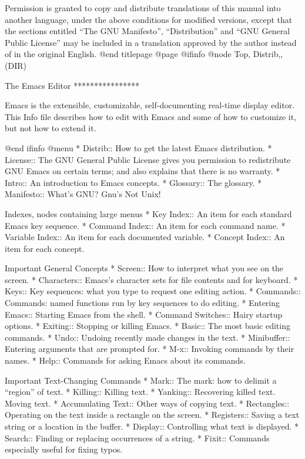 Permission is granted to copy and distribute translations of this manual
into another language, under the above conditions for modified versions,
except that the sections entitled ``The GNU Manifesto'',
``Distribution'' and ``GNU General Public License'' may be included in a
translation approved by the author instead of in the original English.
@end titlepage
@page
@ifinfo
@node Top, Distrib,, (DIR)

The Emacs Editor
****************

Emacs is the extensible, customizable, self-documenting real-time
display editor.  This Info file describes how to edit with Emacs
and some of how to customize it, but not how to extend it.

@end ifinfo
@menu
* Distrib::     How to get the latest Emacs distribution.
* License::     The GNU General Public License gives you permission
		to redistribute GNU Emacs on certain terms; and also
		explains that there is no warranty.
* Intro::       An introduction to Emacs concepts.
* Glossary::    The glossary.
* Manifesto::   What's GNU?  Gnu's Not Unix!

Indexes, nodes containing large menus
* Key Index::      An item for each standard Emacs key sequence.
* Command Index::  An item for each command name.
* Variable Index:: An item for each documented variable.
* Concept Index::  An item for each concept.

Important General Concepts
* Screen::      How to interpret what you see on the screen.
* Characters::  Emacs's character sets for file contents and for keyboard.
* Keys::        Key sequences: what you type to request one editing action.
* Commands::    Commands: named functions run by key sequences to do editing.
* Entering Emacs::    Starting Emacs from the shell.
* Command Switches::  Hairy startup options.
* Exiting::     Stopping or killing Emacs.
* Basic::       The most basic editing commands.
* Undo::        Undoing recently made changes in the text.
* Minibuffer::  Entering arguments that are prompted for.
* M-x::         Invoking commands by their names.
* Help::        Commands for asking Emacs about its commands.

Important Text-Changing Commands
* Mark::        The mark: how to delimit a ``region'' of text.
* Killing::     Killing text.
* Yanking::     Recovering killed text.  Moving text.
* Accumulating Text::
                Other ways of copying text.
* Rectangles::  Operating on the text inside a rectangle on the screen.
* Registers::   Saving a text string or a location in the buffer.
* Display::     Controlling what text is displayed.
* Search::      Finding or replacing occurrences of a string.
* Fixit::       Commands especially useful for fixing typos.

